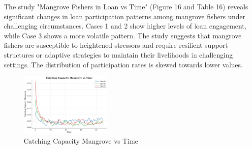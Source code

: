 \documentclass[final,5p,times,twocolumn,authoryear]{elsarticle}
\begin{document}
The study "Mangrove Fishers in Loan vs Time" (Figure 16 and Table 16) reveals significant changes in loan participation patterns among mangrove fishers under challenging circumstances. Cases 1 and 2 show higher levels of loan engagement, while Case 3 shows a more volatile pattern. The study suggests that mangrove fishers are susceptible to heightened stressors and require resilient support structures or adaptive strategies to maintain their livelihoods in challenging settings. The distribution of participation rates is skewed towards lower values.\\
\begin{figure}[htbp]
    \centering
    \includegraphics[width=0.4\textwidth]{graph_all/plots_crit/catching_capacity_mangrove_vs_time.png}
    \caption{Catching Capacity Mangrove vs Time}
    \label{fig:catching_mangrove}
\end{figure}
\begin{table}[htbp]
    \centering
    \caption{Catching Capacity Mangrove - Statistical Analysis}
\end{table}
\end{document}
